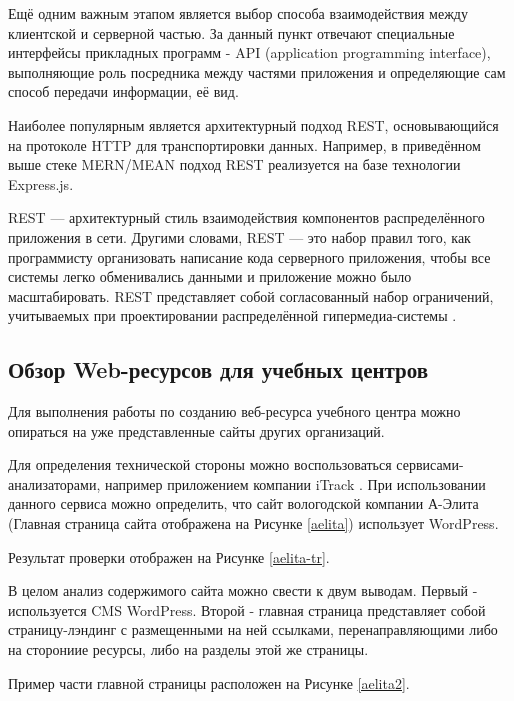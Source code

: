     Ещё одним важным этапом является выбор способа взаимодействия между клиентской и серверной частью.
    За данный пункт отвечают специальные интерфейсы прикладных программ - API (application programming interface), выполняющие роль посредника между частями приложения и определяющие сам способ передачи информации, её вид.

    Наиболее популярным является архитектурный подход REST, основывающийся на протоколе HTTP для транспортировки данных.
    Например, в приведённом выше стеке MERN/MEAN подход REST реализуется на базе технологии Express.js.
    
    REST — архитектурный стиль взаимодействия компонентов распределённого приложения в сети.
    Другими словами, REST — это набор правил того, как программисту организовать написание кода серверного приложения, чтобы все системы легко обменивались данными и приложение можно было масштабировать.
    REST представляет собой согласованный набор ограничений, учитываемых при проектировании распределённой гипермедиа-системы \cite{wiki-rest}.

\subsection{Обзор Web-ресурсов для учебных центров}
    Для выполнения работы по созданию веб-ресурса учебного центра можно опираться на уже представленные сайты других организаций.

    Для определения технической стороны можно воспользоваться сервисами-анализаторами, например приложением компании iTrack \cite{iTrack}. 
    При использовании данного сервиса можно определить, что сайт вологодской компании А-Элита \cite{aelita} (Главная страница сайта отображена на Рисунке \ref{aelita}) использует WordPress.


    Результат проверки отображен на Рисунке \ref{aelita-tr}.


    В целом анализ содержимого сайта можно свести к двум выводам.
    Первый - используется CMS WordPress.
    Второй - главная страница представляет собой страницу-лэндинг с размещенными на ней ссылками, перенаправляющими либо на сторониие ресурсы, либо на разделы этой же страницы.

    Пример части главной страницы расположен на Рисунке \ref{aelita2}.

